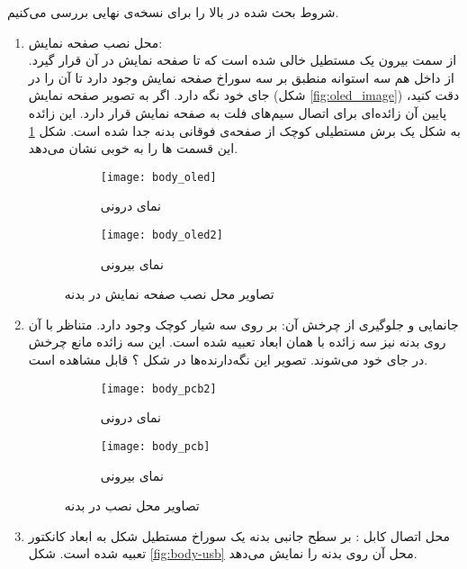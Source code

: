 شروط بحث شده در بالا را برای نسخه‌ی نهایی بررسی می‌کنیم.
\begin{enumerate}
	\item محل نصب صفحه نمایش:\\
	از سمت بیرون یک مستطیل خالی شده است که تا صفحه نمایش در آن قرار گیرد. از داخل هم سه استوانه منطبق بر سه سوراخ صفحه نمایش وجود دارد تا آن را در جای خود نگه دارد. اگر به تصویر صفحه نمایش (شکل \ref{fig:oled_image}) دقت کنید، پایین آن زائده‌ای برای اتصال سیم‌های فلت به صفحه نمایش قرار دارد. این زائده به شکل یک برش مستطیلی کوچک از صفحه‌ی فوقانی بدنه جدا شده است. شکل \ref{fig:body-oled} این قسمت ها را به خوبی نشان می‌دهد.
	
	\begin{figure}[h]
		\centering
		\begin{subfigure}{0.4\textwidth}
			\centering
			\texttt{[image: body\_oled]}
			\caption{نمای درونی}
		\end{subfigure}
		\begin{subfigure}{0.45\textwidth}
			\centering
			\texttt{[image: body\_oled2]}
			\caption{نمای بیرونی}
		\end{subfigure}
		\caption{تصاویر محل نصب صفحه نمایش در بدنه}
		\label{fig:body-oled}
	\end{figure}
	
	\item  جانمایی \pcbf و جلوگیری از چرخش آن:
	بر روی \pcbf سه شیار کوچک وجود دارد. متناظر با آن روی بدنه نیز سه زائده با همان ابعاد تعبیه شده است. این سه زائده مانع چرخش \pcbf در جای خود می‌شوند. تصویر این نگه‌دارنده‌ها در شکل ؟ قابل مشاهده است.
	
	\begin{figure}[h]
		\centering
		\begin{subfigure}{0.4\textwidth}
			\centering
			\texttt{[image: body\_pcb2]}
			\caption{نمای درونی}
		\end{subfigure}
		\begin{subfigure}{0.45\textwidth}
			\centering
			\texttt{[image: body\_pcb]}
			\caption{نمای بیرونی}
			\label{fig:body-pcb-out}
		\end{subfigure}
		\caption{تصاویر محل نصب \pcbf در بدنه}
		\label{fig:body-pcb}
	\end{figure}
	
	\item محل اتصال کابل :
	بر سطح جانبی بدنه یک سوراخ مستطیل شکل به ابعاد کانکتور  تعبیه شده است. شکل \ref{fig:body-usb} محل آن روی بدنه را نمایش می‌دهد.


\end{enumerate}
